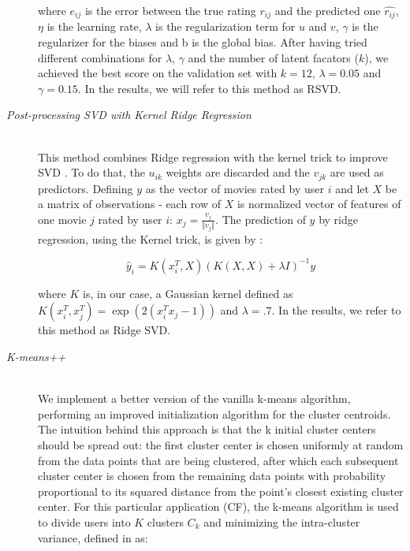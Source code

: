 \documentclass[10pt,conference,compsocconf]{IEEEtran}
\begin{document}
\begin{description}
\noindent where $e_{ij}$ is the error between the true rating $r_{ij}$ and the predicted one $\hat{r_{ij}}$, $\eta$ is the learning rate, $\lambda$ is the regularization term for $u$ and $v$, $\gamma$ is the regularizer for the biases and b is the global bias. After having tried different combinations for $\lambda$, $\gamma$ and the number of latent facators ($k$), we achieved the best score on the validation set with $k = 12$, $\lambda = 0.05$ and $\gamma = 0.15$. In the results, we will refer to this method as RSVD.

\vspace{2mm}
\item[\emph{Post-processing SVD with Kernel Ridge Regression}] \ \\
This method combines Ridge regression with the kernel trick to improve SVD  \cite{paterek}. To do that, the $u_{ik}$ weights are discarded and the $v_{jk}$ are used as predictors. Defining $y$ as the vector of movies rated by user $i$ and let $X$ be a matrix of observations - each row of $X$ is normalized vector of features of one movie $j$ rated by user $i$: $x_j = \frac{v_j}{\Vert v_j \Vert}$. The prediction of $y$ by ridge regression, using the Kernel trick, is given by	:

$$
\hat{y}_i = K(x_i^T,X)(K(X,X) + \lambda I)^{-1}y
$$

\noindent where $K$ is, in our case, a Gaussian kernel defined as $K(x_i^T, x_j^T) = \exp(2(x_i^Tx_j-1))$ and $\lambda = .7$. In the results, we refer to this method as Ridge SVD.
 
\vspace{2mm}
\item[\emph{K-means++}]\ \\
We implement a better version of the vanilla k-means algorithm, performing an improved initialization algorithm for the cluster centroids. The intuition behind this approach is that the k initial cluster centers should be spread out: the first cluster center is chosen uniformly at random from the data points that are being clustered, after which each subsequent cluster center is chosen from the remaining data points with probability proportional to its squared distance from the point's closest existing cluster center. For this particular application (CF), the k-means algorithm is used to divide users into $K$ clusters $C_k$ and minimizing the intra-cluster variance, defined in \cite{paterek} as:


\end{description}
\end{document}
